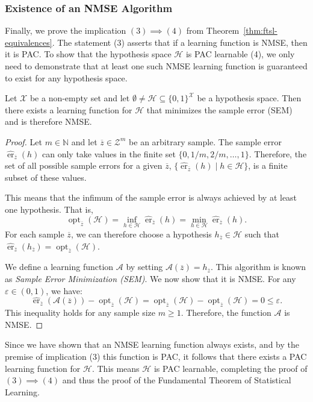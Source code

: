 \subsubsection{Existence of an NMSE Algorithm}

Finally, we prove the implication $(3) \implies (4)$ from Theorem~\ref{thm:ftsl-equivalences}. The statement (3) asserts that if a learning function is NMSE, then it is PAC. To show that the hypothesis space $\mathcal{H}$ is PAC learnable (4), we only need to demonstrate that at least one such NMSE learning function is guaranteed to exist for any hypothesis space.

\begin{proposition}
    Let $\mathcal{X}$ be a non-empty set and let $\emptyset \neq \mathcal{H} \subseteq \{0,1\}^\mathcal{X}$ be a hypothesis space. Then there exists a learning function for $\mathcal{H}$ that minimizes the sample error (SEM) and is therefore NMSE.
\end{proposition}

\begin{proof}
    Let $m \in \mathbb{N}$ and let $\overline{z} \in \mathcal{Z}^m$ be an arbitrary sample. The sample error $\hat{\operatorname{er}}_{\overline{z}}(h)$ can only take values in the finite set $\{0, 1/m, 2/m, \dots, 1\}$. Therefore, the set of all possible sample errors for a given $\overline{z}$, $\{\hat{\operatorname{er}}_{\overline{z}}(h) \mid h \in \mathcal{H}\}$, is a finite subset of these values.

    This means that the infimum of the sample error is always achieved by at least one hypothesis. That is,
    \[
        \operatorname{opt}_{\overline{z}}(\mathcal{H}) = \inf_{h \in \mathcal{H}} \hat{\operatorname{er}}_{\overline{z}}(h) = \min_{h \in \mathcal{H}} \hat{\operatorname{er}}_{\overline{z}}(h).
    \]
    For each sample $\overline{z}$, we can therefore choose a hypothesis $h_{\overline{z}} \in \mathcal{H}$ such that $\hat{\operatorname{er}}_{\overline{z}}(h_{\overline{z}}) = \operatorname{opt}_{\overline{z}}(\mathcal{H})$.

    We define a learning function $\mathcal{A}$ by setting $\mathcal{A}(\overline{z}) = h_{\overline{z}}$. This algorithm is known as \emph{Sample Error Minimization (SEM)}. We now show that it is NMSE. For any $\varepsilon \in (0,1)$, we have:
    \[
        \hat{\operatorname{er}}_{\overline{z}}(\mathcal{A}(\overline{z})) - \operatorname{opt}_{\overline{z}}(\mathcal{H}) = \operatorname{opt}_{\overline{z}}(\mathcal{H}) - \operatorname{opt}_{\overline{z}}(\mathcal{H}) = 0 \le \varepsilon.
    \]
    This inequality holds for any sample size $m \ge 1$. Therefore, the function $\mathcal{A}$ is NMSE.
\end{proof}

Since we have shown that an NMSE learning function always exists, and by the premise of implication (3) this function is PAC, it follows that there exists a PAC learning function for $\mathcal{H}$. This means $\mathcal{H}$ is PAC learnable, completing the proof of $(3) \implies (4)$ and thus the proof of the Fundamental Theorem of Statistical Learning.